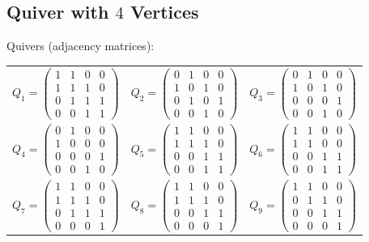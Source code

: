 \documentclass{article}
\begin{document}
\subsection*{Quiver with $4$ Vertices}

\noindent Quivers (adjacency matrices):\\[4pt]
\renewcommand{\arraystretch}{1.5}
\begin{tabular}{lll}
$Q_{1}=\left(\begin{smallmatrix}1&1&0&0\\1&1&1&0\\0&1&1&1\\0&0&1&1\end{smallmatrix}\right)$ & $Q_{2}=\left(\begin{smallmatrix}0&1&0&0\\1&0&1&0\\0&1&0&1\\0&0&1&0\end{smallmatrix}\right)$ & $Q_{3}=\left(\begin{smallmatrix}0&1&0&0\\1&0&1&0\\0&0&0&1\\0&0&1&0\end{smallmatrix}\right)$ \\[6pt]
$Q_{4}=\left(\begin{smallmatrix}0&1&0&0\\1&0&0&0\\0&0&0&1\\0&0&1&0\end{smallmatrix}\right)$ & $Q_{5}=\left(\begin{smallmatrix}1&1&0&0\\1&1&1&0\\0&0&1&1\\0&0&1&1\end{smallmatrix}\right)$ & $Q_{6}=\left(\begin{smallmatrix}1&1&0&0\\1&1&0&0\\0&0&1&1\\0&0&1&1\end{smallmatrix}\right)$ \\[6pt]
$Q_{7}=\left(\begin{smallmatrix}1&1&0&0\\1&1&1&0\\0&1&1&1\\0&0&0&1\end{smallmatrix}\right)$ & $Q_{8}=\left(\begin{smallmatrix}1&1&0&0\\1&1&1&0\\0&0&1&1\\0&0&0&1\end{smallmatrix}\right)$ & $Q_{9}=\left(\begin{smallmatrix}1&1&0&0\\0&1&1&0\\0&0&1&1\\0&0&0&1\end{smallmatrix}\right)$ \\[6pt]
\end{tabular}
\renewcommand{\arraystretch}{1.0}
\end{document}
